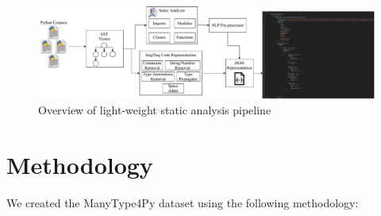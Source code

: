 \documentclass[10pt, conference]{IEEEtran}
\begin{document}
\begin{figure}[!t]
	\centering
	\includegraphics[width=\linewidth]{figs/manytypes4py-pipeline.pdf}
	\caption{Overview of light-weight static analysis pipeline}
	\label{fig:overview-pipeline-sa}
\end{figure}

\section{Methodology}\label{sec:method}
We created the ManyType4Py dataset using the following methodology:
\end{document}
